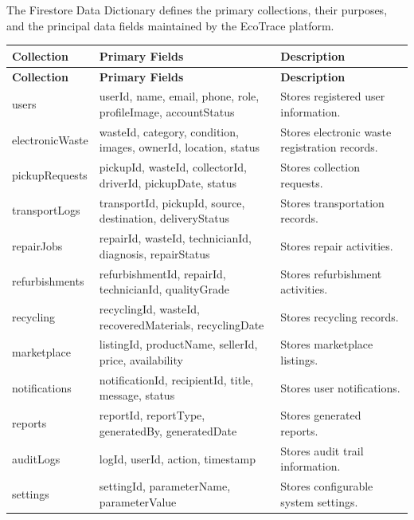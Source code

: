 The Firestore Data Dictionary defines the primary collections,
their purposes, and the principal data fields maintained by the
EcoTrace platform.

\begin{longtable}{|p{4cm}|p{5cm}|p{5cm}|}

\hline
\textbf{Collection} &
\textbf{Primary Fields} &
\textbf{Description} \\
\hline
\endfirsthead

\hline
\textbf{Collection} &
\textbf{Primary Fields} &
\textbf{Description} \\
\hline
\endhead

users &
userId, name, email, phone, role, profileImage, accountStatus &
Stores registered user information. \\
\hline

electronicWaste &
wasteId, category, condition, images, ownerId, location, status &
Stores electronic waste registration records. \\
\hline

pickupRequests &
pickupId, wasteId, collectorId, driverId, pickupDate, status &
Stores collection requests. \\
\hline

transportLogs &
transportId, pickupId, source, destination, deliveryStatus &
Stores transportation records. \\
\hline

repairJobs &
repairId, wasteId, technicianId, diagnosis, repairStatus &
Stores repair activities. \\
\hline

refurbishments &
refurbishmentId, repairId, technicianId, qualityGrade &
Stores refurbishment activities. \\
\hline

recycling &
recyclingId, wasteId, recoveredMaterials, recyclingDate &
Stores recycling records. \\
\hline

marketplace &
listingId, productName, sellerId, price, availability &
Stores marketplace listings. \\
\hline

notifications &
notificationId, recipientId, title, message, status &
Stores user notifications. \\
\hline

reports &
reportId, reportType, generatedBy, generatedDate &
Stores generated reports. \\
\hline

auditLogs &
logId, userId, action, timestamp &
Stores audit trail information. \\
\hline

settings &
settingId, parameterName, parameterValue &
Stores configurable system settings. \\
\hline

\end{longtable}

